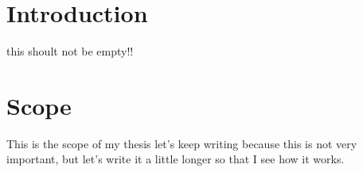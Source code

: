 \chapter{Introduction}

this shoult not be empty!!

\chapter{Scope}

This is the scope of my thesis let's keep writing because this is not very important, but let's write it a little longer
so that I see how it works.

